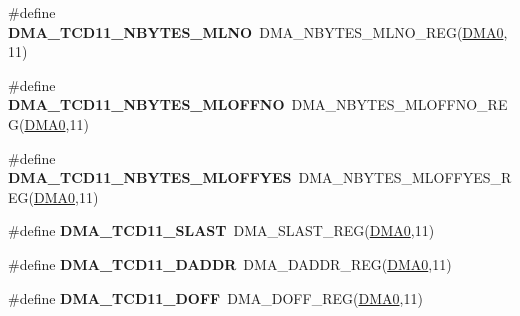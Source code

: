\begin{DoxyCompactItemize}
\item 
\#define {\bfseries D\+M\+A\+\_\+\+T\+C\+D11\+\_\+\+N\+B\+Y\+T\+E\+S\+\_\+\+M\+L\+NO}~D\+M\+A\+\_\+\+N\+B\+Y\+T\+E\+S\+\_\+\+M\+L\+N\+O\+\_\+\+R\+EG(\hyperlink{group__DMA__Peripheral__Access__Layer_ga4103044f9ca209772f513dc694513ffb}{D\+M\+A0},11)\hypertarget{group__DMA__Register__Accessor__Macros_ga31e90b84c561b0753b53a9c503e41757}{}\label{group__DMA__Register__Accessor__Macros_ga31e90b84c561b0753b53a9c503e41757}

\item 
\#define {\bfseries D\+M\+A\+\_\+\+T\+C\+D11\+\_\+\+N\+B\+Y\+T\+E\+S\+\_\+\+M\+L\+O\+F\+F\+NO}~D\+M\+A\+\_\+\+N\+B\+Y\+T\+E\+S\+\_\+\+M\+L\+O\+F\+F\+N\+O\+\_\+\+R\+EG(\hyperlink{group__DMA__Peripheral__Access__Layer_ga4103044f9ca209772f513dc694513ffb}{D\+M\+A0},11)\hypertarget{group__DMA__Register__Accessor__Macros_ga1e7eeff6c1ac1ce7329ce41ed9094618}{}\label{group__DMA__Register__Accessor__Macros_ga1e7eeff6c1ac1ce7329ce41ed9094618}

\item 
\#define {\bfseries D\+M\+A\+\_\+\+T\+C\+D11\+\_\+\+N\+B\+Y\+T\+E\+S\+\_\+\+M\+L\+O\+F\+F\+Y\+ES}~D\+M\+A\+\_\+\+N\+B\+Y\+T\+E\+S\+\_\+\+M\+L\+O\+F\+F\+Y\+E\+S\+\_\+\+R\+EG(\hyperlink{group__DMA__Peripheral__Access__Layer_ga4103044f9ca209772f513dc694513ffb}{D\+M\+A0},11)\hypertarget{group__DMA__Register__Accessor__Macros_ga5eb040bb89b2c7e0e133670971a228ef}{}\label{group__DMA__Register__Accessor__Macros_ga5eb040bb89b2c7e0e133670971a228ef}

\item 
\#define {\bfseries D\+M\+A\+\_\+\+T\+C\+D11\+\_\+\+S\+L\+A\+ST}~D\+M\+A\+\_\+\+S\+L\+A\+S\+T\+\_\+\+R\+EG(\hyperlink{group__DMA__Peripheral__Access__Layer_ga4103044f9ca209772f513dc694513ffb}{D\+M\+A0},11)\hypertarget{group__DMA__Register__Accessor__Macros_gabcae252b374277bc2405a856023d0393}{}\label{group__DMA__Register__Accessor__Macros_gabcae252b374277bc2405a856023d0393}

\item 
\#define {\bfseries D\+M\+A\+\_\+\+T\+C\+D11\+\_\+\+D\+A\+D\+DR}~D\+M\+A\+\_\+\+D\+A\+D\+D\+R\+\_\+\+R\+EG(\hyperlink{group__DMA__Peripheral__Access__Layer_ga4103044f9ca209772f513dc694513ffb}{D\+M\+A0},11)\hypertarget{group__DMA__Register__Accessor__Macros_ga85eb84f9db603a9914f8083f55c8091c}{}\label{group__DMA__Register__Accessor__Macros_ga85eb84f9db603a9914f8083f55c8091c}

\item 
\#define {\bfseries D\+M\+A\+\_\+\+T\+C\+D11\+\_\+\+D\+O\+FF}~D\+M\+A\+\_\+\+D\+O\+F\+F\+\_\+\+R\+EG(\hyperlink{group__DMA__Peripheral__Access__Layer_ga4103044f9ca209772f513dc694513ffb}{D\+M\+A0},11)\hypertarget{group__DMA__Register__Accessor__Macros_gac5dd3f7a538782a6fd6c61bd364a60b6}{}\label{group__DMA__Register__Accessor__Macros_gac5dd3f7a538782a6fd6c61bd364a60b6}


\end{DoxyCompactItemize}
